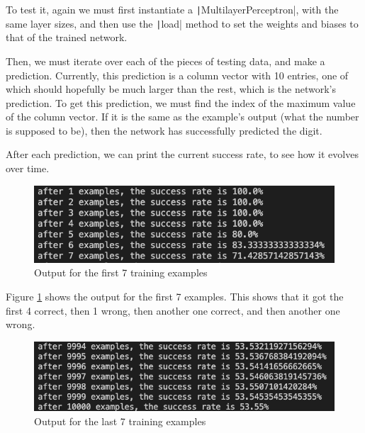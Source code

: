 \documentclass[12pt]{report}
\newcommand{\pil}[1]{\protect\texttt|#1|}
\begin{document}
To test it, again we must first instantiate a \pil{MultilayerPerceptron}, with the same layer sizes, and then use the \pil{load} method to set the weights and biases to that of the trained network.

Then, we must iterate over each of the pieces of testing data, and make a prediction. Currently, this prediction is a column vector with 10 entries, one of which should hopefully be much larger than the rest, which is the network's prediction. To get this prediction, we must find the index of the maximum value of the column vector. If it is the same as the example's output (what the number is supposed to be), then the network has successfully predicted the digit.

After each prediction, we can print the current success rate, to see how it evolves over time.

\begin{center}
\end{center}

\begin{figure}[H]
\centering
\includegraphics[width=14cm]{ss9.2.png}
\caption{Output for the first 7 training examples}\label{fig:ss9.2}
\end{figure}

Figure \ref{fig:ss9.2} shows the output for the first 7 examples. This shows that it got the first 4 correct, then 1 wrong, then another one correct, and then another one wrong.

\begin{figure}[H]
\centering
\includegraphics[width=14cm]{ss9.3.png}
\caption{Output for the last 7 training examples}\label{fig:ss9.3}
\end{figure}
\end{document}
